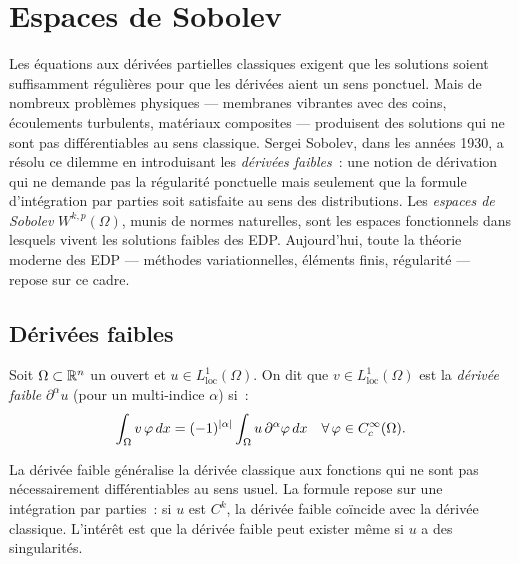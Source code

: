 \chapter{Espaces de Sobolev}
\label{ch:sobolev}

Les \'equations aux d\'eriv\'ees partielles classiques exigent que les solutions soient suffisamment r\'eguli\`eres pour que les d\'eriv\'ees aient un sens ponctuel. Mais de nombreux probl\`emes physiques --- membranes vibrantes avec des coins, \'ecoulements turbulents, mat\'eriaux composites --- produisent des solutions qui ne sont pas diff\'erentiables au sens classique. Sergei Sobolev, dans les ann\'ees 1930, a r\'esolu ce dilemme en introduisant les \emph{d\'eriv\'ees faibles}~: une notion de d\'erivation qui ne demande pas la r\'egularit\'e ponctuelle mais seulement que la \og formule d'int\'egration par parties \fg{} soit satisfaite au sens des distributions. Les \emph{espaces de Sobolev} $W^{k,p}(\Omega)$, munis de normes naturelles, sont les espaces fonctionnels dans lesquels vivent les solutions faibles des EDP. Aujourd'hui, toute la th\'eorie moderne des EDP --- m\'ethodes variationnelles, \'el\'ements finis, r\'egularit\'e --- repose sur ce cadre.

\section{D\'eriv\'ees faibles}

\begin{definition}
Soit $\Omega \subset \mathbb{R}^n$ un ouvert et $u \in L^1_{\mathrm{loc}}(\Omega)$.
On dit que $v \in L^1_{\mathrm{loc}}(\Omega)$ est la \emph{d\'eriv\'ee faible}
$\partial^\alpha u$ (pour un multi-indice $\alpha$) si~:
\[
    \int_\Omega v\, \varphi\, dx = (-1)^{\left| \alpha \right|} \int_\Omega u\, \partial^\alpha \varphi\, dx
    \quad \forall\, \varphi \in C_c^\infty(\Omega).
\]
\end{definition}

\begin{intuition}
La d\'eriv\'ee faible g\'en\'eralise la d\'eriv\'ee classique aux fonctions qui ne sont
pas n\'ecessairement diff\'erentiables au sens usuel. La formule repose sur une
int\'egration par parties~: si $u$ est $C^k$, la d\'eriv\'ee faible co\"incide avec
la d\'eriv\'ee classique. L'int\'er\^et est que la d\'eriv\'ee faible peut exister m\^eme
si $u$ a des singularit\'es.
\end{intuition}

